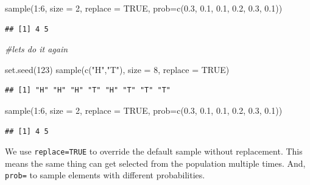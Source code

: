 \documentclass[
]{book}
\newenvironment{Shaded}{\begin{snugshade}}{\end{snugshade}}
\newcommand{\AttributeTok}[1]{\textcolor[rgb]{0.77,0.63,0.00}{#1}}
\newcommand{\CommentTok}[1]{\textcolor[rgb]{0.56,0.35,0.01}{\textit{#1}}}
\newcommand{\ConstantTok}[1]{\textcolor[rgb]{0.00,0.00,0.00}{#1}}
\newcommand{\DecValTok}[1]{\textcolor[rgb]{0.00,0.00,0.81}{#1}}
\newcommand{\FloatTok}[1]{\textcolor[rgb]{0.00,0.00,0.81}{#1}}
\newcommand{\FunctionTok}[1]{\textcolor[rgb]{0.00,0.00,0.00}{#1}}
\newcommand{\NormalTok}[1]{#1}
\newcommand{\SpecialCharTok}[1]{\textcolor[rgb]{0.00,0.00,0.00}{#1}}
\newcommand{\StringTok}[1]{\textcolor[rgb]{0.31,0.60,0.02}{#1}}
\begin{document}
\begin{Shaded}
\begin{Highlighting}[]
\FunctionTok{sample}\NormalTok{(}\DecValTok{1}\SpecialCharTok{:}\DecValTok{6}\NormalTok{, }\AttributeTok{size =} \DecValTok{2}\NormalTok{, }\AttributeTok{replace =} \ConstantTok{TRUE}\NormalTok{, }\AttributeTok{prob=}\FunctionTok{c}\NormalTok{(}\FloatTok{0.3}\NormalTok{, }\FloatTok{0.1}\NormalTok{, }\FloatTok{0.1}\NormalTok{, }\FloatTok{0.2}\NormalTok{, }\FloatTok{0.3}\NormalTok{, }\FloatTok{0.1}\NormalTok{))}
\end{Highlighting}
\end{Shaded}

\begin{verbatim}
## [1] 4 5
\end{verbatim}

\begin{Shaded}
\begin{Highlighting}[]
\CommentTok{\#let\textquotesingle{}s do it again}

\FunctionTok{set.seed}\NormalTok{(}\DecValTok{123}\NormalTok{)}
\FunctionTok{sample}\NormalTok{(}\FunctionTok{c}\NormalTok{(}\StringTok{"H"}\NormalTok{,}\StringTok{"T"}\NormalTok{), }\AttributeTok{size =} \DecValTok{8}\NormalTok{, }\AttributeTok{replace =} \ConstantTok{TRUE}\NormalTok{) }
\end{Highlighting}
\end{Shaded}

\begin{verbatim}
## [1] "H" "H" "H" "T" "H" "T" "T" "T"
\end{verbatim}

\begin{Shaded}
\begin{Highlighting}[]
\FunctionTok{sample}\NormalTok{(}\DecValTok{1}\SpecialCharTok{:}\DecValTok{6}\NormalTok{, }\AttributeTok{size =} \DecValTok{2}\NormalTok{, }\AttributeTok{replace =} \ConstantTok{TRUE}\NormalTok{, }\AttributeTok{prob=}\FunctionTok{c}\NormalTok{(}\FloatTok{0.3}\NormalTok{, }\FloatTok{0.1}\NormalTok{, }\FloatTok{0.1}\NormalTok{, }\FloatTok{0.2}\NormalTok{, }\FloatTok{0.3}\NormalTok{, }\FloatTok{0.1}\NormalTok{))}
\end{Highlighting}
\end{Shaded}

\begin{verbatim}
## [1] 4 5
\end{verbatim}

We use \texttt{replace=TRUE} to override the default sample without replacement. This means the same thing can get selected from the population multiple times. And, \texttt{prob=} to sample elements with different probabilities.
\end{document}
